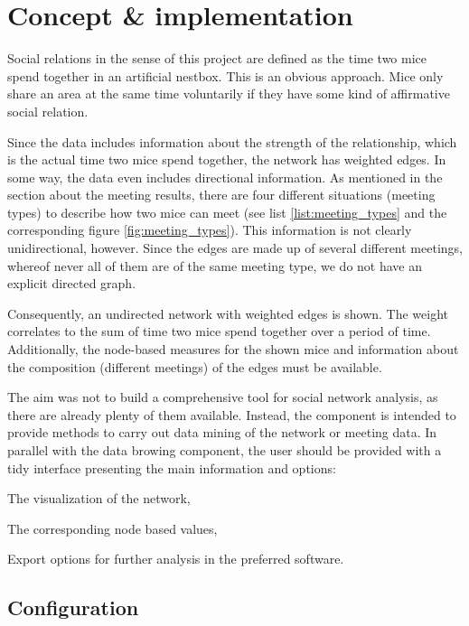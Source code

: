 \section{Concept \& implementation}
\label{sec:graph_concept}

Social relations in the sense of this project are defined as the time two mice spend together in an artificial nestbox. This is an obvious approach. Mice only share an area at the same time voluntarily if they have some kind of affirmative social relation.

Since the data includes information about the strength of the relationship, which is the actual time two mice spend together, the network has weighted edges. In some way, the data even includes directional information. As mentioned in the section about the meeting results, there are four different situations (meeting types) to describe how two mice can meet (see list \ref{list:meeting_types} and the corresponding figure \ref{fig:meeting_types}). This information is not clearly unidirectional, however. Since the edges are made up of several different meetings, whereof never all of them are of the same meeting type, we do not have an explicit directed graph.

Consequently, an undirected network with weighted edges is shown. The weight correlates to the sum of time two mice spend together over a period of time. Additionally, the node-based measures for the shown mice and information about the composition (different meetings) of the edges must be available.

The aim was not to build a comprehensive tool for social network analysis, as there are already plenty of them available. Instead, the component is intended to provide methods to carry out data mining of the network or meeting data. In parallel with the data browing component, the user should be provided with a tidy interface presenting the main information and options:

\begin{mylist}
\item The visualization of the network,
\item The corresponding node based values,
\item Export options for further analysis in the preferred software.
\end{mylist}

\subsection{Configuration}
\label{subsec:graph_config}

